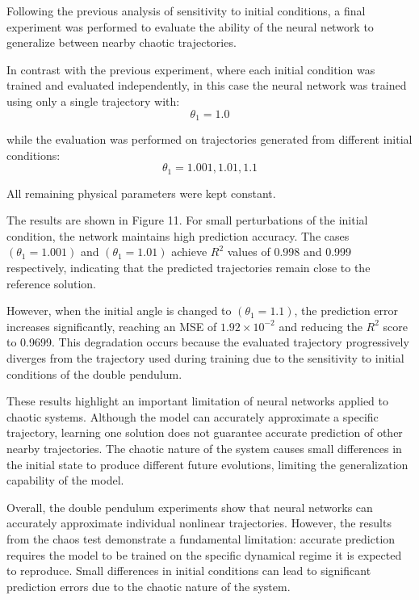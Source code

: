 Following the previous analysis of sensitivity to initial conditions, a final experiment was performed to evaluate the ability of the neural network to generalize between nearby chaotic trajectories.

In contrast with the previous experiment, where each initial condition was trained and evaluated independently, in this case the neural network was trained using only a single trajectory with:
\begin{equation}
    \theta_1=1.0
\end{equation}

while the evaluation was performed on trajectories generated from different initial conditions:
\begin{equation}
    \theta_1={1.001,1.01,1.1}
\end{equation}

All remaining physical parameters were kept constant.

The results are shown in Figure 11. For small perturbations of the initial condition, the network maintains high prediction accuracy. The cases $(\theta_1=1.001)$ and $(\theta_1=1.01)$ achieve $R^2$ values of 0.998 and 0.999 respectively, indicating that the predicted trajectories remain close to the reference solution.

However, when the initial angle is changed to $(\theta_1=1.1)$, the prediction error increases significantly, reaching an MSE of $1.92\times10^{-2}$ and reducing the $R^2$ score to 0.9699. This degradation occurs because the evaluated trajectory progressively diverges from the trajectory used during training due to the sensitivity to initial conditions of the double pendulum.

These results highlight an important limitation of neural networks applied to chaotic systems. Although the model can accurately approximate a specific trajectory, learning one solution does not guarantee accurate prediction of other nearby trajectories. The chaotic nature of the system causes small differences in the initial state to produce different future evolutions, limiting the generalization capability of the model.

Overall, the double pendulum experiments show that neural networks can accurately approximate individual nonlinear trajectories. However, the results from the chaos test demonstrate a fundamental limitation: accurate prediction requires the model to be trained on the specific dynamical regime it is expected to reproduce. Small differences in initial conditions can lead to significant prediction errors due to the chaotic nature of the system.
